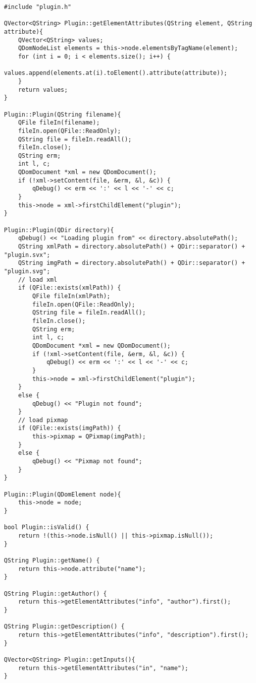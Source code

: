 \begin{lstlisting}
#include "plugin.h"

QVector<QString> Plugin::getElementAttributes(QString element, QString attribute){
    QVector<QString> values;
    QDomNodeList elements = this->node.elementsByTagName(element);
    for (int i = 0; i < elements.size(); i++) {
        values.append(elements.at(i).toElement().attribute(attribute));
    }
    return values;
}

Plugin::Plugin(QString filename){
    QFile fileIn(filename);
    fileIn.open(QFile::ReadOnly);
    QString file = fileIn.readAll();
    fileIn.close();
    QString erm;
    int l, c;
    QDomDocument *xml = new QDomDocument();
    if (!xml->setContent(file, &erm, &l, &c)) {
        qDebug() << erm << ':' << l << '-' << c;
    }
    this->node = xml->firstChildElement("plugin");
}

Plugin::Plugin(QDir directory){
    qDebug() << "Loading plugin from" << directory.absolutePath();
    QString xmlPath = directory.absolutePath() + QDir::separator() + "plugin.svx";
    QString imgPath = directory.absolutePath() + QDir::separator() + "plugin.svg";
    // load xml
    if (QFile::exists(xmlPath)) {
        QFile fileIn(xmlPath);
        fileIn.open(QFile::ReadOnly);
        QString file = fileIn.readAll();
        fileIn.close();
        QString erm;
        int l, c;
        QDomDocument *xml = new QDomDocument();
        if (!xml->setContent(file, &erm, &l, &c)) {
            qDebug() << erm << ':' << l << '-' << c;
        }
        this->node = xml->firstChildElement("plugin");
    }
    else {
        qDebug() << "Plugin not found";
    }
    // load pixmap
    if (QFile::exists(imgPath)) {
        this->pixmap = QPixmap(imgPath);
    }
    else {
        qDebug() << "Pixmap not found";
    }
}

Plugin::Plugin(QDomElement node){
    this->node = node;
}

bool Plugin::isValid() {
    return !(this->node.isNull() || this->pixmap.isNull());
}

QString Plugin::getName() {
    return this->node.attribute("name");
}

QString Plugin::getAuthor() {
    return this->getElementAttributes("info", "author").first();
}

QString Plugin::getDescription() {
    return this->getElementAttributes("info", "description").first();
}

QVector<QString> Plugin::getInputs(){
    return this->getElementAttributes("in", "name");
}


\end{lstlisting}

